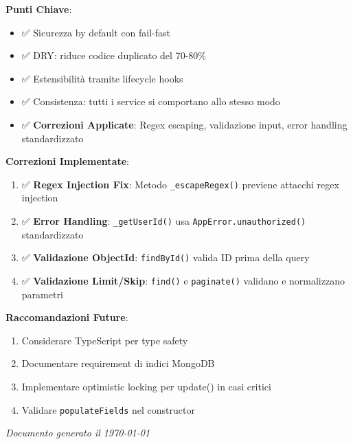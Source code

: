 \documentclass[11pt,a4paper]{article}
\begin{document}
\textbf{Punti Chiave}:
\begin{itemize}
    \item ✅ Sicurezza by default con fail-fast
    \item ✅ DRY: riduce codice duplicato del 70-80\%
    \item ✅ Estensibilità tramite lifecycle hooks
    \item ✅ Consistenza: tutti i service si comportano allo stesso modo
    \item ✅ \textbf{Correzioni Applicate}: Regex escaping, validazione input, error handling standardizzato
\end{itemize}

\textbf{Correzioni Implementate}:
\begin{enumerate}
    \item ✅ \textbf{Regex Injection Fix}: Metodo \texttt{\_escapeRegex()} previene attacchi regex injection
    \item ✅ \textbf{Error Handling}: \texttt{\_getUserId()} usa \texttt{AppError.unauthorized()} standardizzato
    \item ✅ \textbf{Validazione ObjectId}: \texttt{findById()} valida ID prima della query
    \item ✅ \textbf{Validazione Limit/Skip}: \texttt{find()} e \texttt{paginate()} validano e normalizzano parametri
\end{enumerate}

\textbf{Raccomandazioni Future}:
\begin{enumerate}
    \item Considerare TypeScript per type safety
    \item Documentare requirement di indici MongoDB
    \item Implementare optimistic locking per update() in casi critici
    \item Validare \texttt{populateFields} nel constructor
\end{enumerate}

\vspace{1cm}

\textit{Documento generato il \today}
\end{document}
